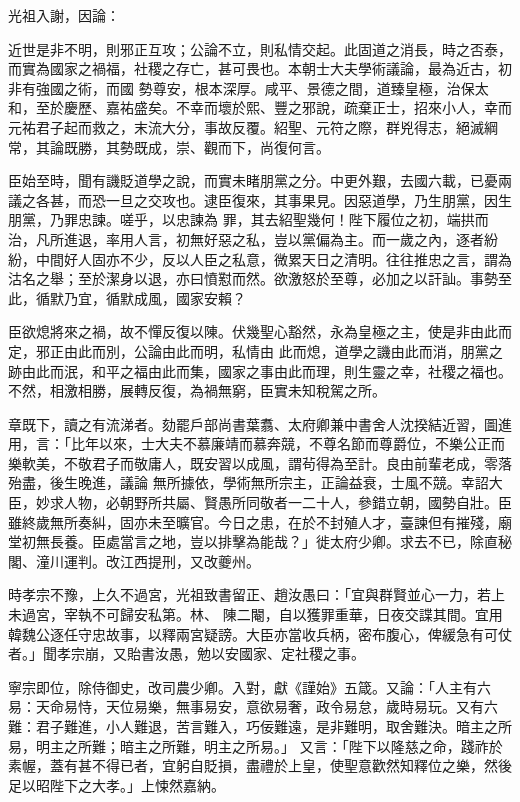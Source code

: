 \begin{pinyinscope}
 光祖入謝，因論：



 近世是非不明，則邪正互攻；公論不立，則私情交起。此固道之消長，時之否泰，而實為國家之禍福，社稷之存亡，甚可畏也。本朝士大夫學術議論，最為近古，初非有強國之術，而國
 勢尊安，根本深厚。咸平、景德之間，道臻皇極，治保太和，至於慶歷、嘉祐盛矣。不幸而壞於熙、豐之邪說，疏棄正士，招來小人，幸而元祐君子起而救之，末流大分，事故反覆。紹聖、元符之際，群兇得志，絕滅綱常，其論既勝，其勢既成，崇、觀而下，尚復何言。



 臣始至時，聞有譏貶道學之說，而實未睹朋黨之分。中更外艱，去國六載，已憂兩議之各甚，而恐一旦之交攻也。逮臣復來，其事果見。因惡道學，乃生朋黨，因生朋黨，乃罪忠諫。嗟乎，以忠諫為
 罪，其去紹聖幾何！陛下履位之初，端拱而治，凡所進退，率用人言，初無好惡之私，豈以黨偏為主。而一歲之內，逐者紛紛，中間好人固亦不少，反以人臣之私意，微累天日之清明。往往推忠之言，謂為沽名之舉；至於潔身以退，亦曰憤懟而然。欲激怒於至尊，必加之以訐訕。事勢至此，循默乃宜，循默成風，國家安賴？



 臣欲熄將來之禍，故不憚反復以陳。伏幾聖心豁然，永為皇極之主，使是非由此而定，邪正由此而別，公論由此而明，私情由
 此而熄，道學之譏由此而消，朋黨之跡由此而泯，和平之福由此而集，國家之事由此而理，則生靈之幸，社稷之福也。不然，相激相勝，展轉反復，為禍無窮，臣實未知稅駕之所。



 章既下，讀之有流涕者。劾罷戶部尚書葉翥、太府卿兼中書舍人沈揆結近習，圖進用，言：「比年以來，士大夫不慕廉靖而慕奔競，不尊名節而尊爵位，不樂公正而樂軟美，不敬君子而敬庸人，既安習以成風，謂茍得為至計。良由前輩老成，零落殆盡，後生晚進，議論
 無所據依，學術無所宗主，正論益衰，士風不競。幸詔大臣，妙求人物，必朝野所共屬、賢愚所同敬者一二十人，參錯立朝，國勢自壯。臣雖終歲無所奏糾，固亦未至曠官。今日之患，在於不封殖人才，臺諫但有摧殘，廟堂初無長養。臣處當言之地，豈以排擊為能哉？」徙太府少卿。求去不已，除直秘閣、潼川運判。改江西提刑，又改夔州。



 時孝宗不豫，上久不過宮，光祖致書留正、趙汝愚曰：「宜與群賢並心一力，若上未過宮，宰執不可歸安私第。林、
 陳二閹，自以獲罪重華，日夜交諜其間。宜用韓魏公逐任守忠故事，以釋兩宮疑謗。大臣亦當收兵柄，密布腹心，俾緩急有可仗者。」聞孝宗崩，又貽書汝愚，勉以安國家、定社稷之事。



 寧宗即位，除侍御史，改司農少卿。入對，獻《謹始》五箴。又論：「人主有六易：天命易恃，天位易樂，無事易安，意欲易奢，政令易怠，歲時易玩。又有六難：君子難進，小人難退，苦言難入，巧佞難遠，是非難明，取舍難決。暗主之所易，明主之所難；暗主之所難，明主之所易。」
 又言：「陛下以隆慈之命，踐祚於素幄，蓋有甚不得已者，宜躬自貶損，盡禮於上皇，使聖意歡然知釋位之樂，然後足以昭陛下之大孝。」上悚然嘉納。




\end{pinyinscope}
